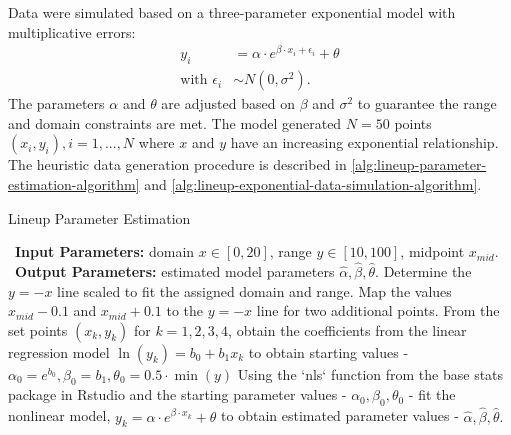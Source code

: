 \documentclass[print]{nuthesis}
\begin{document}
Data were simulated based on a three-parameter exponential model with multiplicative errors:
\begin{align}
y_i & = \alpha\cdot e^{\beta\cdot x_i + \epsilon_i} + \theta \\
\text{with } \epsilon_i & \sim N(0, \sigma^2). \nonumber
\end{align}
The parameters \(\alpha\) and \(\theta\) are adjusted based on \(\beta\) and \(\sigma^2\) to guarantee the range and domain constraints are met.
The model generated \(N = 50\) points \((x_i, y_i), i = 1,...,N\) where \(x\) and \(y\) have an increasing exponential relationship.
The heuristic data generation procedure is described in \cref{alg:lineup-parameter-estimation-algorithm} and \cref{alg:lineup-exponential-data-simulation-algorithm}.

\begin{algorithm}
  \caption{Lineup Parameter Estimation}\label{alg:lineup-parameter-estimation-algorithm}
  \begin{algorithmic}[1]
    \Statex \textbullet~\textbf{Input Parameters:} domain $x\in[0,20]$, range $y\in[10,100]$, midpoint $x_{mid}$.
    \Statex \textbullet~\textbf{Output Parameters:} estimated model parameters $\hat\alpha, \hat\beta, \hat\theta$.
    \State Determine the $y=-x$ line scaled to fit the assigned domain and range.
    \State Map the values $x_{mid} - 0.1$ and $x_{mid} + 0.1$ to the $y=-x$ line for two additional points.
    \State From the set points $(x_k, y_k)$ for $k = 1,2,3,4$, obtain the coefficients from the linear regression model $\ln(y_k) = b_0 +b_1x_k$ to obtain starting values - $\alpha_0 = e^{b_0}, \beta_0 =  b_1, \theta_0 = 0.5\cdot \min(y)$
    \State Using the `nls` function from the base stats package in Rstudio and the starting parameter values - $\alpha_0, \beta_0, \theta_0$ - fit the nonlinear model, $y_k = \alpha\cdot e^{\beta\cdot x_k}+\theta$ to obtain estimated parameter values - $\hat\alpha, \hat\beta, \hat\theta.$
  \end{algorithmic}
\end{algorithm}
\end{document}
